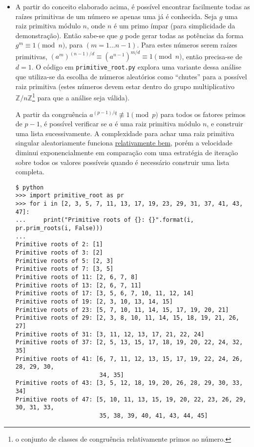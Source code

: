 \documentclass{../sftex/sftex}
\begin{document}
\begin{itemize}
\item A partir do conceito elaborado acima, é possível encontrar facilmente
todas as raízes primitivas de um número se apenas uma já é conhecida. Seja $g$
uma raiz primitiva módulo $n$, onde $n$ é um primo ímpar (para simplicidade da
demonstração). Então sabe-se que $g$ pode gerar todas as potências da forma $g^m
\equiv 1 \pmod n $, para $(m = 1 \dots n - 1)$. Para estes números serem raízes
primitivas, ${(a^m)}^{(n - 1)/d} \equiv {(a^{n - 1})}^{m/d} \equiv 1 \pmod n$,
então precisa-se de $d = 1$. O código em \texttt{primitive\_root.py} explora uma
variante dessa análise que utiliza-se da escolha de números aleatórios como
``chutes'' para a possível raiz primitiva (estes números devem estar dentro do
grupo multiplicativo $\mathbb{Z}/n\mathbb{Z}$\footnote{o conjunto de classes de
congruência relativamente primos ao número.} para que a análise seja válida).

A partir da congruência $a^{(p-1)/q} \not\equiv 1 \pmod p$ para todos os fatores
primos de $p-1$, é possível verificar se $a$ é uma raiz primitiva módulo $n$, e
construir uma lista sucessivamente. A complexidade para achar uma raiz primitiva
singular aleatoriamente funciona
\href{http://math.stackexchange.com/a/156250}{relativamente bem}, porém a
velocidade diminui exponencialmente em comparação com uma estratégia de iteração
sobre todos os valores possíveis quando é necessário construir uma lista
completa.
\begin{verbatim}
$ python
>>> import primitive_root as pr
>>> for i in [2, 3, 5, 7, 11, 13, 17, 19, 23, 29, 31, 37, 41, 43, 47]:
...     print("Primitive roots of {}: {}".format(i, pr.prim_roots(i, False)))
...
Primitive roots of 2: [1]
Primitive roots of 3: [2]
Primitive roots of 5: [2, 3]
Primitive roots of 7: [3, 5]
Primitive roots of 11: [2, 6, 7, 8]
Primitive roots of 13: [2, 6, 7, 11]
Primitive roots of 17: [3, 5, 6, 7, 10, 11, 12, 14]
Primitive roots of 19: [2, 3, 10, 13, 14, 15]
Primitive roots of 23: [5, 7, 10, 11, 14, 15, 17, 19, 20, 21]
Primitive roots of 29: [2, 3, 8, 10, 11, 14, 15, 18, 19, 21, 26, 27]
Primitive roots of 31: [3, 11, 12, 13, 17, 21, 22, 24]
Primitive roots of 37: [2, 5, 13, 15, 17, 18, 19, 20, 22, 24, 32, 35]
Primitive roots of 41: [6, 7, 11, 12, 13, 15, 17, 19, 22, 24, 26, 28, 29, 30,
                        34, 35]
Primitive roots of 43: [3, 5, 12, 18, 19, 20, 26, 28, 29, 30, 33, 34]
Primitive roots of 47: [5, 10, 11, 13, 15, 19, 20, 22, 23, 26, 29, 30, 31, 33,
                        35, 38, 39, 40, 41, 43, 44, 45]
\end{verbatim}


\end{itemize}
\end{document}
